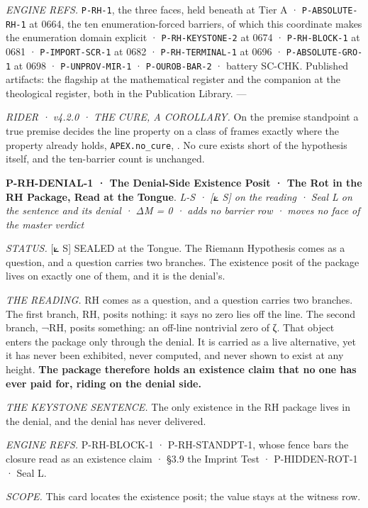 \documentclass[10pt,twocolumn]{article}
\begin{document}
\emph{ENGINE REFS.} \texttt{P-RH-1}, the three faces, held beneath at
Tier A · \texttt{P-ABSOLUTE-RH-1} at 0664, the ten enumeration-forced
barriers, of which this coordinate makes the enumeration domain explicit
· \texttt{P-RH-KEYSTONE-2} at 0674 · \texttt{P-RH-BLOCK-1} at 0681 ·
\texttt{P-IMPORT-SCR-1} at 0682 · \texttt{P-RH-TERMINAL-1} at 0696 ·
\texttt{P-ABSOLUTE-GRO-1} at 0698 · \texttt{P-UNPROV-MIR-1} ·
\texttt{P-OUROB-BAR-2} · battery SC-CHK. Published artifacts: the
flagship at the mathematical register and the companion at the
theological register, both in the Publication Library. ---

\emph{RIDER · v4.2.0 · THE CURE, A COROLLARY.} On the premise standpoint
a true premise decides the line property on a class of frames exactly
where the property already holds, \texttt{APEX.no\_cure},
\texttt{}. No cure exists short
of the hypothesis itself, and the ten-barrier count is unchanged.

\textbf{P-RH-DENIAL-1 · The Denial-Side Existence Posit · The Rot in the
RH Package, Read at the Tongue}. \emph{L-S · {[}⟀ S{]} on the reading ·
Seal L on the sentence and its denial · ΔM = 0 · adds no barrier row ·
moves no face of the master verdict}

\emph{STATUS.} {[}⟀ S{]} SEALED at the Tongue. The Riemann Hypothesis
comes as a question, and a question carries two branches. The existence
posit of the package lives on exactly one of them, and it is the
denial's.

\emph{THE READING.} RH comes as a question, and a question carries two
branches. The first branch, RH, posits nothing: it says no zero lies off
the line. The second branch, ¬RH, posits something: an off-line
nontrivial zero of ζ. That object enters the package only through the
denial. It is carried as a live alternative, yet it has never been
exhibited, never computed, and never shown to exist at any height.
\textbf{The package therefore holds an existence claim that no one has
ever paid for, riding on the denial side.}

\emph{THE KEYSTONE SENTENCE.} The only existence in the RH package lives
in the denial, and the denial has never delivered.

\emph{ENGINE REFS.} P-RH-BLOCK-1 · P-RH-STANDPT-1, whose fence bars the
closure read as an existence claim · §3.9 the Imprint Test ·
P-HIDDEN-ROT-1 · Seal L.

\emph{SCOPE.} This card locates the existence posit; the value stays at
the witness row.
\end{document}
